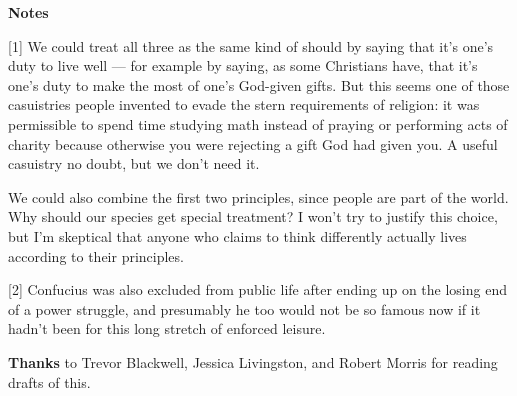\textbf{Notes}

[1] We could treat all three as the same kind of should by
                  saying that it's one's duty to live well --- for example
                  by saying, as some Christians have, that it's one's duty to
                  make the most of one's God-given gifts. But this seems one of
                  those casuistries people invented to evade the stern
                  requirements of religion: it was permissible to spend time
                  studying math instead of praying or performing acts of charity
                  because otherwise you were rejecting a gift God had given you.
                  A useful casuistry no doubt, but we don't need it.

We
                  could also combine the first two principles, since people are
                  part of the world. Why should our species get special
                  treatment? I won't try to justify this choice, but I'm
                  skeptical that anyone who claims to think differently actually
                  lives according to their principles.

[2] Confucius was also excluded from public life after ending
                  up on the losing end of a power struggle, and presumably he
                  too would not be so famous now if it hadn't been for this long
                  stretch of enforced leisure.



\textbf{Thanks} to Trevor Blackwell, Jessica Livingston, and
                    Robert Morris for reading drafts of this.


              
            
          
          
            
              
                


                  
              
            
          
        
